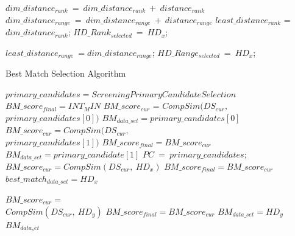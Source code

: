 \documentclass{vldb}
\begin{document}
\begin{itemize}
\begin{algorithm}
\begin{algorithmic}[1]
		\State $dim\_distance_{rank}\  =\  dim\_distance_{rank} \ + \ distance_{rank}$
		\State $dim\_distance_{range}\  =\  dim\_distance_{range} \ + \ distance_{range}$ 
	\EndFor
 			\State $least\_distance_{rank}$ = $dim\_distance_{rank}$;
			\State $HD\_Rank_{selected}\ = \ HD_x$;
	\EndIf
   	 
   		\State $least\_distance_{range}\ = dim\_distance_{range}$;
   	 	\State $HD\_Range_{selected}\ = \ HD_x$;
	\EndIf
\EndFor
\State{}
\EndProcedure
\end{algorithmic}
\end{algorithm}



 
\begin{algorithm}
\caption{Best Match Selection Algorithm}
\label{best_match_selection}
\fontsize{10}{15}
\begin{algorithmic}[1]
\State $primary\_candidates = Screening$\textendash$PrimaryCandidateSelection$
\State $BM\_score_{final} = INT_MIN$
\State $BM\_score_{cur}$ = $CompSim(DS_{cur},$ \\ $primary\_candidates[0])$
\State $BM_{data\_set} = primary\_candidates[0]$
\State $BM\_score_{cur}= CompSim(DS_{cur},$ \\ $primary\_candidates[1])$
  \State $BM\_score_{final} = BM\_score_{cur}$
  \State $BM_{data\_set} = primary\_candidate[1]$
\EndIf
$PC\ =\ primary\_candidates;$
  \State $BM\_score_{cur} = CompSim(DS_{cur},\ HD_x)$
    \State $BM\_score_{final} = BM\_score_{cur}$
    \State $best\_match_{data\_set} = HD_x$
  \EndIf
\EndFor

  \State $BM\_score_{cur} =$ \\ $ CompSim(DS_{cur},\ HD_y)$
    \State $BM\_score_{final} = BM\_score_{cur}$
    \State $BM_{data\_set} = HD_y$
  \EndIf
\EndFor
\Return  $BM_{data_set}$
\EndProcedure
\end{algorithmic}
\end{algorithm}


\end{itemize}
\end{document}
